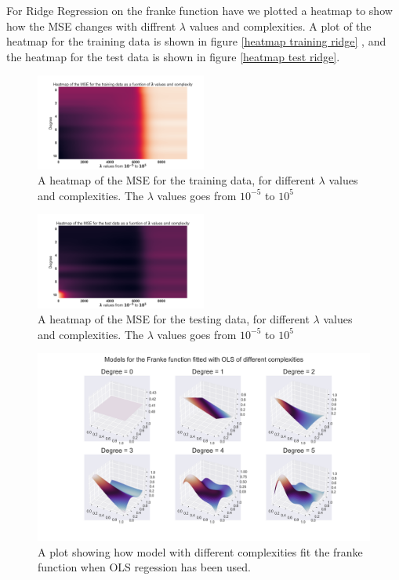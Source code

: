 \noindent For Ridge Regression on the franke function have we plotted a heatmap to show 
how the MSE changes with diffrent $\lambda$ values and complexities. A plot of
the heatmap for the training data is shown in figure \eqref{heatmap training ridge}
, and the heatmap for the test data is shown in figure \eqref{heatmap test ridge}.
\begin{figure}[h]
	\centering
	\includegraphics[width=0.5\textwidth]{Figure_8.png}
	\caption{A heatmap of the MSE for the training data, for different $\lambda$ values and complexities. The $\lambda$ values goes from $10^{-5}$ to $10^{5}$ }
	\label{heatmap training ridge}
\end{figure}
\begin{figure}[h]
	\centering
	\includegraphics[width=0.5\textwidth]{Figure_7.png}
	\caption{A heatmap of the MSE for the testing data, for different $\lambda$ values and complexities. The $\lambda$ values goes from $10^{-5}$ to $10^{5}$}
	\label{heatmap test ridge}
\end{figure}





\begin{figure}[h]
	\centering
	\includegraphics[width=\textwidth]{Figure_2.png}
	\caption{A plot showing how model with different complexities fit the franke function when OLS regession has been used.}
	\label{OLS figure}
\end{figure}


